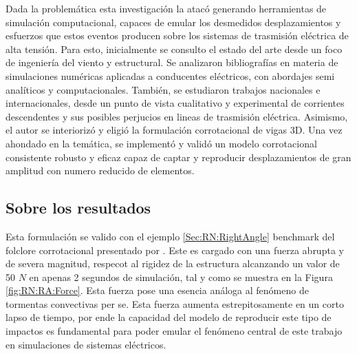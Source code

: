 Dada la problemática esta investigación la atacó  generando herramientas de simulación computacional, capaces de emular los desmedidos desplazamientos y esfuerzos que estos eventos producen sobre los sistemas de trasmisión eléctrica de alta tensión. Para esto, inicialmente se consulto el estado del arte desde un foco de ingeniería del viento y estructural. Se analizaron bibliografías en materia de simulaciones numéricas aplicadas a conducentes eléctricos, con abordajes semi analíticos y computacionales. También, se estudiaron trabajos nacionales e internacionales, desde un punto de vista cualitativo y experimental de corrientes descendentes y sus posibles perjucios  en lineas de trasmisión eléctrica.  Asimismo, el autor se interiorizó y eligió la formulación corrotacional de vigas 3D. Una vez ahondado en la temática, se implementó y validó un modelo corrotacional consistente robusto y eficaz capaz de captar y reproducir desplazamientos de gran amplitud con numero reducido de elementos.


\subsection{Sobre los resultados}

Esta formulación se valido con el ejemplo \ref{Sec:RN:RightAngle} benchmark del folclore corrotacional presentado por \cite{simo1988dynamics}. Este es cargado con una fuerza abrupta y de severa magnitud, respecot al  rigidez de la estructura alcanzando un valor de 50 $N$ en apenas 2 segundos de simulación, tal y como se muestra en la Figura \ref{fig:RN:RA:Force}. Esta fuerza pose una esencia análoga al fenómeno de tormentas convectivas per se. Esta fuerza aumenta estrepitosamente en un corto lapso de tiempo, por ende la capacidad del modelo de reproducir este tipo de impactos es fundamental para poder emular el fenómeno central de este trabajo en simulaciones de sistemas eléctricos.

